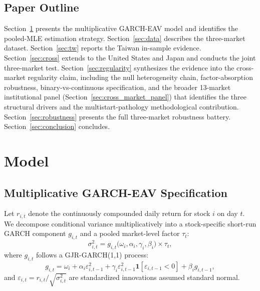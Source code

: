 \documentclass[12pt,a4paper]{article}
\begin{document}
\subsection*{Paper Outline}

Section~\ref{sec:model} presents the multiplicative GARCH-EAV model and
identifies the pooled-MLE estimation strategy. Section~\ref{sec:data} describes
the three-market dataset. Section~\ref{sec:tw} reports the Taiwan in-sample
evidence. Section~\ref{sec:cross} extends to the United States and Japan
and conducts the joint three-market test. Section~\ref{sec:regularity} synthesizes
the evidence into the cross-market regularity claim, including the null
heterogeneity chain, factor-absorption robustness, binary-vs-continuous
specification, and the broader 13-market institutional panel
(Section~\ref{sec:cross_market_panel}) that identifies the three structural
drivers and the multistart-pathology methodological contribution.
Section~\ref{sec:robustness} presents the full three-market robustness battery.
Section~\ref{sec:conclusion} concludes.

\section{Model}
\label{sec:model}

\subsection{Multiplicative GARCH-EAV Specification}

Let $r_{i,t}$ denote the continuously compounded daily return for stock $i$ on
day $t$. We decompose conditional variance multiplicatively into a stock-specific
short-run GARCH component $g_{i,t}$ and a pooled market-level factor $\tau_t$:
%
\begin{equation}
\sigma^2_{i,t} = g_{i,t}\bigl(\omega_i, \alpha_i, \gamma_i, \beta_i\bigr)
                 \times \tau_t,
\label{eq:mult}
\end{equation}
%
where $g_{i,t}$ follows a GJR-GARCH(1,1) process:
%
\begin{equation}
g_{i,t} = \omega_i + \alpha_i \varepsilon^2_{i,t-1}
          + \gamma_i \varepsilon^2_{i,t-1} \mathbf{1}[\varepsilon_{i,t-1}<0]
          + \beta_i g_{i,t-1},
\label{eq:gjr}
\end{equation}
%
and $\varepsilon_{i,t} = r_{i,t} / \sqrt{\sigma^2_{i,t}}$ are standardized
innovations assumed standard normal.
\end{document}

